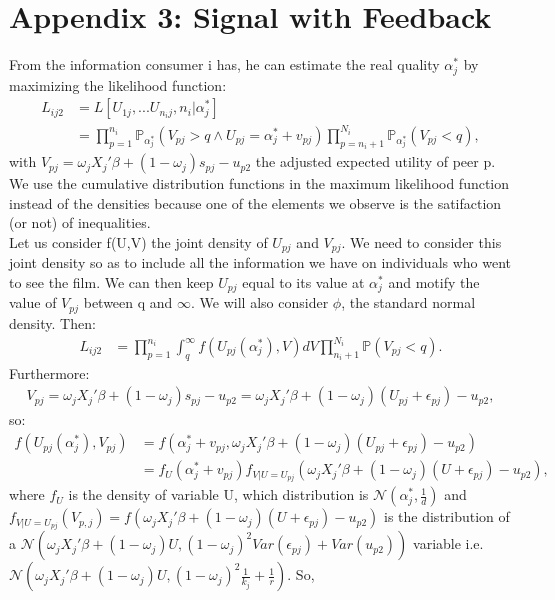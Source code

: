 \section*{Appendix 3: Signal with Feedback}
From the information consumer i has, he can estimate the real quality $\alpha_{j}^{*}$ by maximizing the likelihood function:
\begin{align*}
	L_{i j 2}&=L[U_{1 j},...U_{n_{i} j}, n_{i}|\alpha_{j}^{*}]\\
	&=\prod_{p=1}^{n_{i}}\mathbb{P}_{\alpha_{j}^{*}}(V_{p j}>q \wedge U_{p j}=\alpha_{j}^{*}+v_{p j})
	\prod_{p=n_{i}+1}^{N_{i}}\mathbb{P}_{\alpha_{j}^{*}}(V_{p j}<q),
\end{align*}
with $V_{p j}=\omega_{j} X_{j}'\beta+(1-\omega_{j})s_{p j}-u_{p 2}$ the adjusted expected utility of peer p. We use the cumulative distribution functions in the maximum likelihood function instead of the densities because one of the elements we observe is the satifaction (or not) of inequalities.\\
Let us consider f(U,V) the joint density of $U_{p j}$ and $V_{p j}$. We need to consider this joint density so as to include all the information we have on individuals who went to see the film. We can then keep $U_{p j}$ equal to its value at $\alpha_{j}^{*}$ and motify the value of $V_{p j}$ between q and $\infty$. We will also consider $\phi$, the standard normal density. Then:
\begin{align*}
	L_{i j 2}&=\prod_{p=1}^{n_{i}}\int_{q}^{\infty}f(U_{p j}(\alpha_{j}^{*}), V)dV \prod_{n_{i}+1}^{N_{i}}\mathbb{P}(V_{p j}<q).
\end{align*}	
Furthermore:
\begin{align*}
	V_{p j}=\omega_{j} X_{j}'\beta+(1-\omega_{j})s_{p j}-u_{p 2}=\omega_{j} X_{j}'\beta+(1-\omega_{j})(U_{p j}+\epsilon_{p j})-u_{p 2},
\end{align*}	
so:
\begin{align*}
	f(U_{p j}(\alpha_{j}^{*}), V_{p j})
	&=f(\alpha_{j}^{*}+v_{p j}, \omega_{j} X_{j}'\beta+(1-\omega_{j})(U_{p j}+\epsilon_{p j})-u_{p 2})\\
	&=f_{U}(\alpha_{j}^{*}+v_{p j})f_{V|U=U_{p j}}(\omega_{j} X_{j}'\beta+(1-\omega_{j})(U+\epsilon_{p j})-u_{p 2}),	
\end{align*}
where $f_{U}$ is the density of variable U, which distribution is $\mathcal{N}(\alpha_{j}^{*}, \frac{1}{d})$ and $f_{V|U=U_{p j}}(V_{p, j})=f(\omega_{j} X_{j}'\beta+(1-\omega_{j})(U+\epsilon_{p j})-u_{p 2})$ is the distribution of a $\mathcal{N}(\omega_{j} X_{j}'\beta+(1-\omega_{j})U, (1-\omega_{j})^{2}Var(\epsilon_{p j})+Var(u_{p 2}))$ variable i.e. $\mathcal{N}(\omega_{j} X_{j}'\beta+(1-\omega_{j})U, (1-\omega_{j})^{2}\frac{1}{k_{j}}+\frac{1}{r})$. So,
